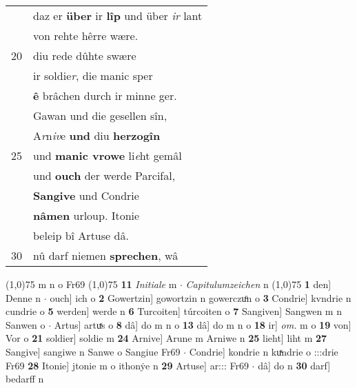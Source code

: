 \documentclass[8pt,a4paper,notitlepage]{article}
\begin{document}
\begin{table}[ht]
\begin{minipage}[t]{0.5\linewidth}
\begin{tabular}{rl}
 & daz er \textbf{über} ir \textbf{lîp} und über \textit{ir} lant\\ 
 & von rehte hêrre wære.\\ 
20 & diu rede dûhte swære\\ 
 & ir soldie\textit{r}, die manic sper\\ 
 & \textbf{ê} brâchen durch ir minne ger.\\ 
 & Gawan und die gesellen sîn,\\ 
 & A\textit{r}n\textit{iv}e \textbf{und} diu \textbf{herzogîn}\\ 
25 & und \textbf{manic vrowe} li\textit{e}ht gemâl\\ 
 & und \textbf{ouch} der werde Parcifal,\\ 
 & \textbf{Sangive} und Condrie\\ 
 & \textbf{nâmen} urloup. Itonie\\ 
 & beleip bî Artuse dâ.\\ 
30 & nû darf niemen \textbf{sprechen}, wâ\\ 
\end{tabular}
\scriptsize
\line(1,0){75} \newline
m n o Fr69 \newline
\line(1,0){75} \newline
\textbf{11} \textit{Initiale} m   $\cdot$ \textit{Capitulumzeichen} n  \newline
\line(1,0){75} \newline
\textbf{1} den] Denne n  $\cdot$ ouch] ich o \textbf{2} Gowertzin] gowortzin n gowerczuͦn o \textbf{3} Condrie] kvndrie n cundrie o \textbf{5} werden] werde n \textbf{6} Turcoiten] túrcoiten o \textbf{7} Sangiven] Sangwen m n Sanwen o  $\cdot$ Artus] artuͯs o \textbf{8} dâ] do m n o \textbf{13} dâ] do m n o \textbf{18} ir] \textit{om.} m o \textbf{19} von] Vor o \textbf{21} soldier] soldie m \textbf{24} Arnive] Arune m Arniwe n \textbf{25} lieht] liht m \textbf{27} Sangive] sangiwe n Sanwe o Sangiue Fr69  $\cdot$ Condrie] kondrie n kuͯndrie o :::drie Fr69 \textbf{28} Itonie] jtonie m o ithonẏe n \textbf{29} Artuse] ar::: Fr69  $\cdot$ dâ] do n \textbf{30} darf] bedarff n \newline
\end{minipage}
\end{table}
\newpage
\end{document}
